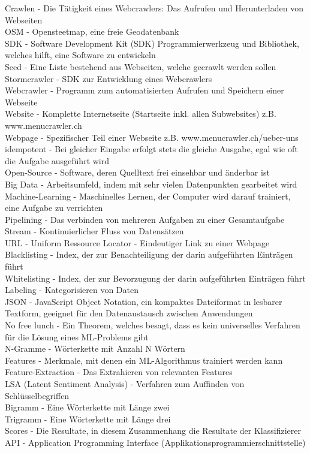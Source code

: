 Crawlen - Die Tätigkeit eines Webcrawlers: Das Aufrufen und Herunterladen von Webseiten\\
OSM - Opensteetmap, eine freie Geodatenbank\\
SDK - Software Development Kit (SDK) Programmierwerkzeug und Bibliothek, welches hilft, eine Software zu entwickeln\\
Seed - Eine Liste bestehend aus Webseiten, welche gecrawlt werden sollen\\
Stormcrawler - SDK zur Entwicklung eines Webcrawlers\\
Webcrawler - Programm zum automatisierten Aufrufen und Speichern einer Webseite\\
Website - Komplette Internetseite (Startseite inkl. allen Subwebsites) z.B. www.menucrawler.ch\\
Webpage - Spezifischer Teil einer Webseite z.B. www.menucrawler.ch/ueber-uns\\
idempotent - Bei gleicher Eingabe erfolgt stets die gleiche Ausgabe, egal wie oft die Aufgabe ausgeführt wird\\
Open-Source - Software, deren Quelltext frei einsehbar und änderbar ist\\
Big Data - Arbeitsumfeld, indem mit sehr vielen Datenpunkten gearbeitet wird\\
Machine-Learning - Maschinelles Lernen, der Computer wird darauf trainiert, eine Aufgabe zu verrichten\\
Pipelining - Das verbinden von mehreren Aufgaben zu einer Gesamtaufgabe\\
Stream - Kontinuierlicher Fluss von Datensätzen\\
URL - Uniform Ressource Locator - Eindeutiger Link zu einer Webpage\\
Blacklisting - Index, der zur Benachteiligung der darin aufgeführten Einträgen führt\\
Whitelisting - Index, der zur Bevorzugung der darin aufgeführten Einträgen führt\\
Labeling - Kategorisieren von Daten\\
JSON - JavaScript Object Notation, ein kompaktes Dateiformat in lesbarer Textform, geeignet für den Datenaustausch zwischen Anwendungen\\
No free lunch - Ein Theorem, welches besagt, dass es kein universelles Verfahren für die Lösung eines ML-Problems gibt\\
N-Gramme - Wörterkette mit Anzahl N Wörtern\\
Features - Merkmale, mit denen ein ML-Algorithmus trainiert werden kann\\
Feature-Extraction - Das Extrahieren von relevanten Features\\
LSA (Latent Sentiment Analysis) - Verfahren zum Auffinden von Schlüsselbegriffen\\
Bigramm - Eine Wörterkette mit Länge zwei\\
Trigramm - Eine Wörterkette mit Länge drei\\
Scores - Die Resultate, in diesem Zusammenhang die Resultate der Klassifizierer\\
API - Application Programming Interface (Applikationsprogrammierschnittstelle)\\